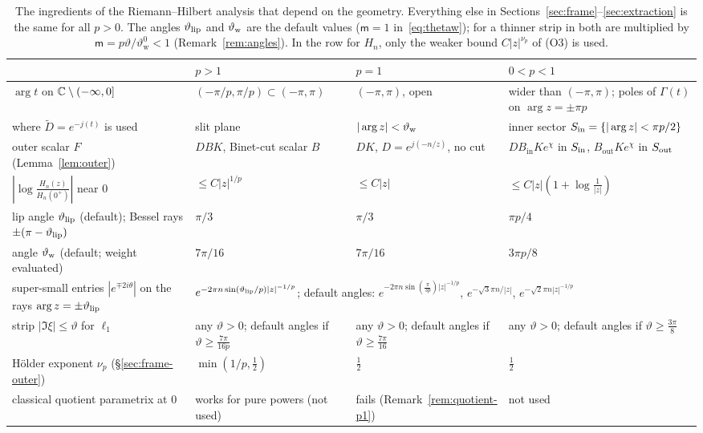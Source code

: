 \begin{table}[ht]
\centering\small
\renewcommand{\arraystretch}{1.25}
\begin{tabular}{@{}p{3.3cm}p{3.2cm}p{3.1cm}p{3.6cm}@{}}
\toprule
& $p>1$ & $p=1$ & $0<p<1$\tabularnewline
\midrule
\raggedright $\arg t$ on $\mathbb{C}\setminus(-\infty,0]$ & \raggedright $(-\pi/p,\pi/p)\subset(-\pi,\pi)$ & \raggedright $(-\pi,\pi)$, open & \raggedright wider than $(-\pi,\pi)$; poles of $\Gamma(t)$ on $\arg z=\pm\pi p$\tabularnewline
\raggedright where $\tilde D=e^{-j(t)}$ is used & \raggedright slit plane & \raggedright $|\arg z|<\vartheta_{\mathrm{w}}$ & \raggedright inner sector $S_{\mathrm{in}}=\{|\arg z|<\pi p/2\}$\tabularnewline
\raggedright outer scalar $F$ (Lemma~\ref{lem:outer}) & \raggedright $DBK$, Binet-cut scalar $B$ & \raggedright $DK$, $D=e^{j(-n/z)}$, no cut & \raggedright $DB_{\mathrm{in}}Ke^{\chi}$ in $S_{\mathrm{in}}$, $B_{\mathrm{out}}Ke^{\chi}$ in $S_{\mathrm{out}}$\tabularnewline
\raggedright $|\log\frac{H_n(z)}{H_n(0^+)}|$ near $0$ & \raggedright $\le C|z|^{1/p}$ & \raggedright $\le C|z|$ & \raggedright $\le C|z|(1+\log\frac1{|z|})$\tabularnewline
\raggedright lip angle $\vartheta_{\mathrm{lip}}$ (default); Bessel rays $\pm(\pi-\vartheta_{\mathrm{lip}})$ & \raggedright $\pi/3$ & \raggedright $\pi/3$ & \raggedright $\pi p/4$\tabularnewline
\raggedright angle $\vartheta_{\mathrm{w}}$ (default; weight evaluated) & \raggedright $7\pi/16$ & \raggedright $7\pi/16$ & \raggedright $3\pi p/8$\tabularnewline
\raggedright super-small entries $|e^{\mp2i\theta}|$ on the rays $\arg z=\pm\vartheta_{\mathrm{lip}}$ & \multicolumn{3}{p{10.3cm}}{\raggedright $e^{-2\pi n\sin(\vartheta_{\mathrm{lip}}/p)|z|^{-1/p}}$; default angles: $e^{-2\pi n\sin(\frac{\pi}{3p})|z|^{-1/p}}$, $e^{-\sqrt3\pi n/|z|}$, $e^{-\sqrt2\pi n|z|^{-1/p}}$}\tabularnewline
\raggedright strip $|\Im\xi|\le\vartheta$ for $\ell_1$ & \raggedright any $\vartheta>0$; default angles if $\vartheta\ge\frac{7\pi}{16p}$ & \raggedright any $\vartheta>0$; default angles if $\vartheta\ge\frac{7\pi}{16}$ & \raggedright any $\vartheta>0$; default angles if $\vartheta\ge\frac{3\pi}{8}$\tabularnewline
\raggedright H\"older exponent $\nu_p$ (\S\ref{sec:frame-outer}) & \raggedright $\min(1/p,\frac12)$ & \raggedright $\frac12$ & \raggedright $\frac12$\tabularnewline
\raggedright classical quotient parametrix at $0$ & \raggedright works for pure powers (not used) & \raggedright fails (Remark~\ref{rem:quotient-p1}) & \raggedright not used\tabularnewline
\bottomrule
\end{tabular}
\caption{The ingredients of the Riemann--Hilbert analysis that depend on the geometry. Everything else in
Sections~\ref{sec:frame}--\ref{sec:extraction} is the same for all $p>0$. The angles $\vartheta_{\mathrm{lip}}$ and $\vartheta_{\mathrm{w}}$ are the default
values ($\mathsf m=1$ in~\eqref{eq:thetaw}); for a thinner strip in \Ath{\vartheta} both are multiplied by
$\mathsf m=p\vartheta/\vartheta^0_{\mathrm w}<1$ (Remark~\ref{rem:angles}). In the row for $H_n$, only the weaker bound
$C|z|^{\nu_p}$ of (O3) is used.}
\label{tab:geometry}
\end{table}


